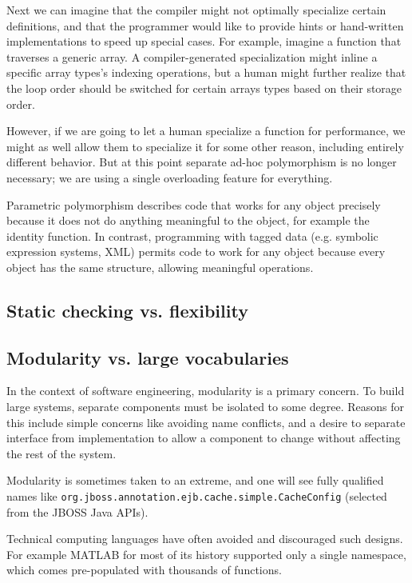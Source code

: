 Next we can imagine that the compiler might not optimally specialize
certain definitions, and that the programmer would like to provide
hints or hand-written implementations to speed up special cases.
For example, imagine a function that traverses a generic array. A compiler-generated
specialization might inline a specific array types's indexing operations, but a human
might further realize that the loop order should be switched for certain
arrays types based on their storage order.

However, if we are going to let a human specialize a function for performance,
we might as well allow them to specialize it for some other reason, including
entirely different behavior. But at this point separate ad-hoc polymorphism
is no longer necessary; we are using a single overloading feature for
everything.


Parametric polymorphism describes code that works for any object precisely
because it does not do anything meaningful to the object, for example the
identity function. In contrast, programming with tagged data (e.g.
symbolic expression systems, XML) permits code to work for any object
because every object has the same structure, allowing meaningful
operations.

\subsection{Static checking vs. flexibility}

\subsection{Modularity vs. large vocabularies}

In the context of software engineering, modularity is a primary concern.
To build large systems, separate components must be isolated to some
degree.
Reasons for this include simple concerns like avoiding name conflicts,
and a desire to separate interface from implementation to allow
a component to change without affecting the rest of the system.

Modularity is sometimes taken to an extreme, and one will see
fully qualified names like \texttt{org.jboss.annotation.ejb.cache.simple.CacheConfig}
(selected from the JBOSS Java APIs).

Technical computing languages have often avoided and discouraged such
designs. For example MATLAB for most of its history supported only a single
namespace, which comes pre-populated with thousands of functions.



